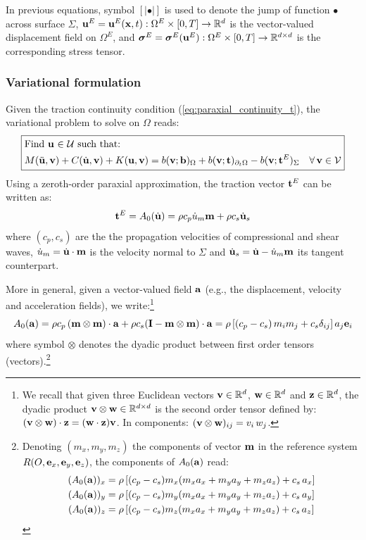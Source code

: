 \documentclass{report}
\newcommand{\bx}{\textbf{x}}
\newcommand{\bb}{\textbf{b}}
\newcommand{\bu}{\textbf{u}}
\newcommand{\bv}{\textbf{v}}
\newcommand{\bt}{\boldsymbol t}
\newcommand{\bz}{\textbf{z}}
\def\bsigma{\mbox{\boldmath${\sigma}$}}
\def\ba{{\bf{a}}}
\def\bb{{\bf{b}}}
\def\be{{\bf e}}
\def\be{{\bf{e}}}
\def\bI{{{\bf{I}}}}
\def\bm{{\bf m}}
\def\bx{{\bf{x}}}
\def\bt{{\bf t}}
\def\bu{{\bf{u}}}
\def\bv{{\bf{v}}}
\def\bw{{\bf w}}
\def\bz{{\bf z}}
\begin{document}
In previous equations, symbol $[|\bullet|]$ is used to denote the jump of function $\bullet$ across surface $\Sigma$, $\bu^{E}=\bu^{E}(\bx,t):\Omega^{E}\times[0,T]\to\mathbb{R}^{d}$ is the vector-valued displacement field on $\Omega^{E}$, and $\bsigma^{E}=\bsigma^{E}(\bu^{E}):\Omega^{E}\times[0,T]\to\mathbb{R}^{d\times d}$ is the corresponding stress tensor.

\subsubsection{Variational formulation}

Given the traction continuity condition (\ref{eq:paraxial_continuity_t}),
the variational problem to solve on $\Omega$ reads:
\begin{equation}
\boxed{\begin{aligned} & \text{Find \ensuremath{\bu} \ensuremath{\in} \ensuremath{\mathcal{U}} such that: }\\
 & M(\ddot{\bu},\bv)+C(\dot{\bu},\bv)+K(\bu,\bv)=b(\bv;\bb)_{\Omega}+b(\bv;\bt)_{\partial_{t}\Omega}-b(\bv;\bt^{E})_{\Sigma}\quad\forall\,\bv\in\mathcal{V}
\end{aligned}
}\label{eq:paraxial_varf_1}
\end{equation}
Using a zeroth-order paraxial approximation, the traction vector $\bt^{E}$ can be written as:
\begin{equation}
\bt^{E}=A_{0}(\dot{\bu}) = \rho c_p \dot{u}_m \bm + \rho c_s \dot{\bu}_s
\label{eq:paraxial_lin_form}
\end{equation}
where $(c_p,c_s)$ are the the propagation velocities of compressional and shear waves, $\dot{u}_m = \dot{\bu} \cdot \bm$ is the velocity normal to $\Sigma$ and  $\dot{\bu}_s = \dot{\bu} - \dot{u}_m \bm$ its tangent counterpart.

More in general, given a vector-valued field $\ba$ (e.g., the displacement, velocity and acceleration fields), we write:\footnote{We recall that given three Euclidean vectors $\bv \in \mathbb{R}^d$, $\bw\in \mathbb{R}^d$ and $\bz\in \mathbb{R}^d$, the dyadic product $\bv \otimes \bw \in \mathbb{R}^{d\times d}$ is the second order tensor defined by: $(\bv \otimes \bw)\cdot \bz = (\bw\cdot \bz) \bv $. In components: $(\bv \otimes \bw)_{ij}=v_i\,w_j$.}
\begin{equation}
    A_{0}(\ba) = \rho c_p \, (\bm \otimes \bm) \cdot \ba + \rho c_s ({\bI} - \bm \otimes \bm) \cdot \ba = \rho \left[ (c_p - c_s)\, m_i m_j + c_s \delta_{ij} \right] a_j \be_i
\end{equation}
where symbol $\otimes$ denotes the dyadic product between first order tensors (vectors).\footnote{Denoting $(m_x,m_y,m_z)$ the components of vector $\bm$ in the reference system $R(O,\be_x,\be_y,\be_z)$, the components of $A_{0}(\ba)$ read:
\begin{align}
    (A_{0}(\ba))_x & = \rho \left[(c_p-c_s) m_x (m_x a_x + m_y a_y + m_z a_z) + c_s\,a_x \right] \\
    (A_{0}(\ba))_y & =  \rho \left[(c_p-c_s) m_y (m_x a_x + m_y a_y + m_z a_z) + c_s\,a_y \right] \\
    (A_{0}(\ba))_z & =  \rho \left[(c_p-c_s) m_z (m_x a_x + m_y a_y + m_z a_z) + c_s\,a_z \right]
\end{align}}
\end{document}
